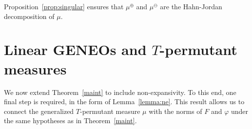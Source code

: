 \documentclass[11pt]{article}
\newcommand{\R}{\mathbb{R}}
\newcommand{\p}{\varphi}
\begin{document}
Proposition~\ref{prop:singular} ensures that $\mu^\oplus$ and $\mu^\ominus$ are the Hahn-Jordan decomposition of $\mu$.

\section{Linear GENEOs and $T$-permutant measures}
\label{Linear}

We now extend Theorem~\ref{maint}
to include non-expansivity. To this end, one
final step is required, in the form of Lemma~\ref{lemma:ne}. This result
allows us to connect the generalized $T$-permutant measure $\mu$ with the norms of $F$
and $\p$ under the same hypotheses as in Theorem~\ref{maint}.
\end{document}
